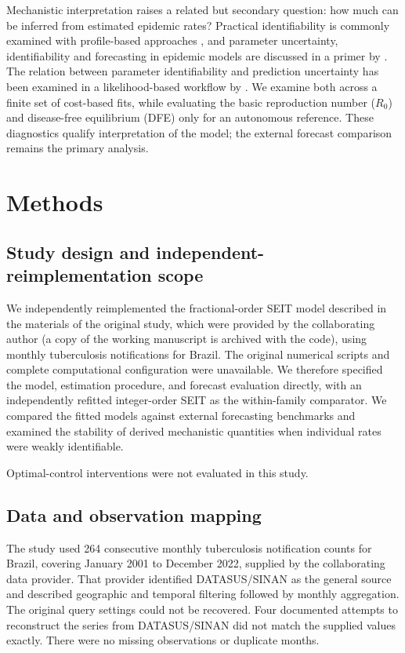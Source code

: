 \documentclass[pdflatex,sn-mathphys-ay]{sn-jnl}
\begin{document}
Mechanistic interpretation raises a related but secondary question: how much can be inferred from estimated epidemic rates? Practical identifiability is commonly examined with profile-based approaches \citep{raue2009,wieland2021}, and parameter uncertainty, identifiability and forecasting in epidemic models are discussed in a primer by \citet{chowell2017}. The relation between parameter identifiability and prediction uncertainty has been examined in a likelihood-based workflow by \citet{simpson2024}. We examine both across a finite set of cost-based fits, while evaluating the basic reproduction number ($R_0$) and disease-free equilibrium (DFE) only for an autonomous reference. These diagnostics qualify interpretation of the model; the external forecast comparison remains the primary analysis.

\section{Methods}

\subsection{Study design and independent-reimplementation scope}

We independently reimplemented the fractional-order SEIT model described in the materials of the original study, which were provided by the collaborating author (a copy of the working manuscript is archived with the code), using monthly tuberculosis notifications for Brazil. The original numerical scripts and complete computational configuration were unavailable. We therefore specified the model, estimation procedure, and forecast evaluation directly, with an independently refitted integer-order SEIT as the within-family comparator. We compared the fitted models against external forecasting benchmarks and examined the stability of derived mechanistic quantities when individual rates were weakly identifiable.



Optimal-control interventions were not evaluated in this study.

\subsection{Data and observation mapping}

The study used 264 consecutive monthly tuberculosis notification counts for Brazil, covering January 2001 to December 2022, supplied by the collaborating data provider. That provider identified DATASUS/SINAN as the general source and described geographic and temporal filtering followed by monthly aggregation. The original query settings could not be recovered. Four documented attempts to reconstruct the series from DATASUS/SINAN did not match the supplied values exactly. There were no missing observations or duplicate months.
\end{document}
